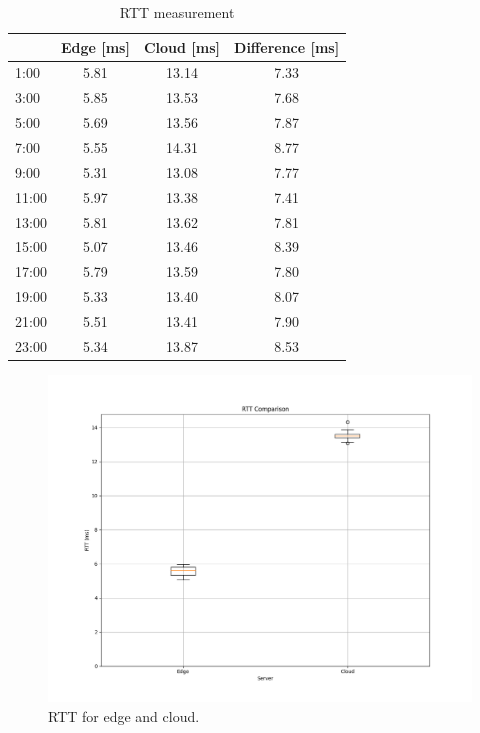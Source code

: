 \documentclass[12pt,a4paper,twoside]{report}
\begin{document}
\begin{table}[!ht]
    \centering
	\caption{RTT measurement}
	\label{T:ping}
    \begin{tabular}{|l|c|c|c|}
    \hline
        & \textbf{Edge [ms]} & \textbf{Cloud [ms]} & \textbf{Difference [ms]} \\\hline
        1:00 & 5.81 & 13.14 & 7.33 \\ \hline
        3:00 & 5.85 & 13.53  & 7.68 \\ \hline
        5:00 & 5.69 & 13.56  & 7.87 \\ \hline
        7:00 & 5.55 & 14.31  & 8.77 \\ \hline
        9:00 & 5.31 & 13.08  & 7.77 \\ \hline
        11:00 & 5.97 & 13.38 & 7.41 \\ \hline
        13:00 & 5.81 & 13.62 & 7.81 \\ \hline
        15:00 & 5.07 & 13.46 & 8.39 \\ \hline
        17:00 & 5.79 & 13.59 & 7.80 \\ \hline
        19:00 & 5.33 & 13.40 & 8.07 \\ \hline
        21:00 & 5.51 & 13.41 & 7.90 \\ \hline
        23:00 & 5.34 & 13.87 & 8.53 \\ \hline
    \end{tabular}
\end{table}

\begin{figure}[ht]
	\centering
	\captionsetup{labelsep=period,name=Graph}
	\includegraphics[width=13cm]{./images/RTT_comp_box.png} 
	\caption{RTT for edge and cloud.}
	\label{G:pings-box}
\end{figure}
\end{document}
